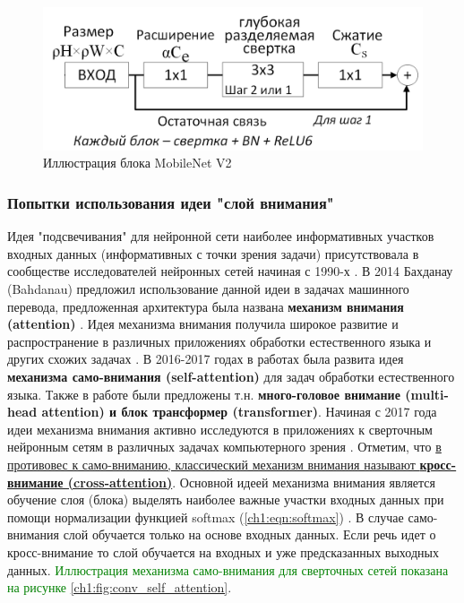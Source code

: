 \documentclass[12pt]{article}
\begin{document}
\begin{sloppypar}
\begin{figure}[!h]
	\begin{center}
		\includegraphics[width=0.99\linewidth]{./figuresch1/mobilenet_block_v1_2.png}
		\caption{Иллюстрация блока MobileNet V2}		
		\label{ch1:fig:mobilenet_block_v2}
	\end{center}
\end{figure}

\subsubsection{Попытки использования идеи "слой внимания"}
Идея "подсвечивания" для нейронной сети наиболее информативных участков входных данных (информативных с точки зрения задачи) присутствовала в сообществе исследователей нейронных сетей начиная с 1990-х \cite{itti2001computational}. В 2014 Бахданау (Bahdanau) предложил использование данной идеи в задачах машинного перевода, предложенная архитектура была названа \textbf{механизм внимания (attention)} \cite{bahdanau2014neural}. Идея механизма внимания получила широкое развитие и распространение в различных приложениях обработки естественного языка и других схожих задачах \cite{chaudhari2019attentive}. В 2016-2017 годах в работах \cite{cheng2016long, parikh2016decomposable, vaswani2017attention} была развита идея \textbf{механизма само-внимания (self-attention)} для задач обработки естественного языка. Также в работе \cite{ vaswani2017attention} были предложены т.н. \textbf{много-головое внимание (multi-head attention) и блок трансформер (transformer)}. Начиная с 2017 года идеи механизма внимания активно исследуются в приложениях к сверточным нейронным сетям в различных задачах компьютерного зрения \cite{Lilian2021Attention, yang2020overview}. Отметим, что \uline{в противовес к само-вниманию, классический механизм внимания называют \textbf{кросс-внимание (cross-attention)}}. 
Основной идеей механизма  внимания  является обучение слоя (блока)  выделять наиболее важные участки входных данных при помощи нормализации функцией softmax (\ref{ch1:eqn:softmax}) \cite{Lilian2021Attention}. В случае само-внимания слой обучается только на основе входных данных. Если речь идет о кросс-внимание то слой обучается на входных и уже предсказанных выходных данных. 
\textcolor{green}{
Иллюстрация механизма само-внимания для сверточных сетей показана на рисунке \ref{ch1:fig:conv_self_attention}}. 


\end{sloppypar}
\end{document}
